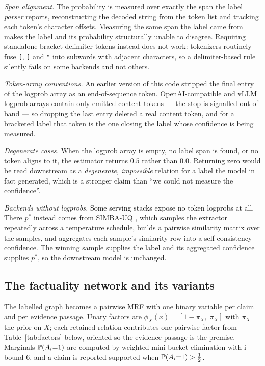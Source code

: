 \emph{Span alignment.} The probability is measured over exactly the span the label \emph{parser}
reports, reconstructing the decoded string from the token list and tracking each token's character
offsets. Measuring the same span the label came from makes the label and its probability
structurally unable to disagree. Requiring standalone bracket-delimiter tokens instead does not
work: tokenizers routinely fuse \texttt{[}, \texttt{]} and \texttt{"} into subwords with adjacent
characters, so a delimiter-based rule silently fails on some backends and not others.

\emph{Token-array conventions.} An earlier version of this code stripped the final entry of the
logprob array as an end-of-sequence token. OpenAI-compatible and vLLM logprob arrays contain only
emitted content tokens --- the stop is signalled out of band --- so dropping the last entry
deleted a real content token, and for a bracketed label that token is the one closing the label
whose confidence is being measured.

\emph{Degenerate cases.} When the logprob array is empty, no label span is found, or no token
aligns to it, the estimator returns $0.5$ rather than $0.0$. Returning zero would be read
downstream as a \emph{degenerate, impossible} relation for a label the model in fact generated,
which is a stronger claim than ``we could not measure the confidence''.

\emph{Backends without logprobs.} Some serving stacks expose no token logprobs at all. There
$p^\ast$ instead comes from SIMBA-UQ \citep{simbauq}, which samples the extractor repeatedly across
a temperature schedule, builds a pairwise similarity matrix over the samples, and aggregates each
sample's similarity row into a self-consistency confidence. The winning sample supplies the label
and its aggregated confidence supplies $p^\ast$, so the downstream model is unchanged.

\subsection{The factuality network and its variants}

The labelled graph becomes a pairwise MRF with one binary variable per claim and per evidence
passage. Unary factors are $\phi_X(x)=[1-\pi_X,\;\pi_X]$ with $\pi_X$ the prior on $X$; each
retained relation contributes one pairwise factor from Table~\ref{tab:factors} below, oriented so
the evidence passage is the premise. Marginals $\mathbb{P}\!\left( A_i{=}1 \right)$ are computed by weighted mini-bucket
elimination \citep{wmb} with i-bound $6$, and a claim is reported supported when
$\mathbb{P}\!\left( A_i{=}1 \right)>\tfrac12$.

